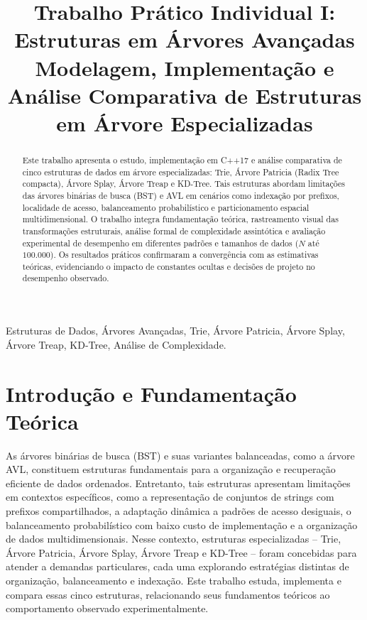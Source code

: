 \documentclass[conference]{IEEEtran}
\title{Trabalho Prático Individual I: Estruturas em Árvores Avançadas\\
{\large Modelagem, Implementação e Análise Comparativa de Estruturas em Árvore Especializadas}}
\author{\IEEEauthorblockN{Gabriel Alves Faria}
\IEEEauthorblockA{\textit{Graduando em Engenharia de Computação} \\
\textit{Centro Federal de Educação Tecnológica de Minas Gerais (CEFET-MG -- Campus V)}\\
Divinópolis, Brasil \\
gabrielalvesfaria@gmail.com}
}
\begin{document}
\maketitle

\begin{abstract}
Este trabalho apresenta o estudo, implementação em C++17 e análise comparativa de cinco estruturas de dados em árvore especializadas: Trie, Árvore Patricia (Radix Tree compacta), Árvore Splay, Árvore Treap e KD-Tree. Tais estruturas abordam limitações das árvores binárias de busca (BST) e AVL em cenários como indexação por prefixos, localidade de acesso, balanceamento probabilístico e particionamento espacial multidimensional. O trabalho integra fundamentação teórica, rastreamento visual das transformações estruturais, análise formal de complexidade assintótica e avaliação experimental de desempenho em diferentes padrões e tamanhos de dados ($N$ até $100.000$). Os resultados práticos confirmaram a convergência com as estimativas teóricas, evidenciando o impacto de constantes ocultas e decisões de projeto no desempenho observado.
\end{abstract}

\begin{IEEEkeywords}
Estruturas de Dados, Árvores Avançadas, Trie, Árvore Patricia, Árvore Splay, Árvore Treap, KD-Tree, Análise de Complexidade.
\end{IEEEkeywords}

\section{Introdução e Fundamentação Teórica}

As árvores binárias de busca (BST) e suas variantes balanceadas, como a árvore AVL, constituem estruturas fundamentais para a organização e recuperação eficiente de dados ordenados. Entretanto, tais estruturas apresentam limitações em contextos específicos, como a representação de conjuntos de strings com prefixos compartilhados, a adaptação dinâmica a padrões de acesso desiguais, o balanceamento probabilístico com baixo custo de implementação e a organização de dados multidimensionais. Nesse contexto, estruturas especializadas -- Trie, Árvore Patricia, Árvore Splay, Árvore Treap e KD-Tree -- foram concebidas para atender a demandas particulares, cada uma explorando estratégias distintas de organização, balanceamento e indexação. Este trabalho estuda, implementa e compara essas cinco estruturas, relacionando seus fundamentos teóricos ao comportamento observado experimentalmente.
\end{document}
